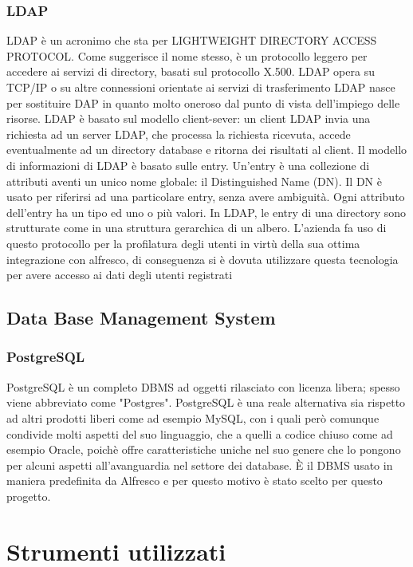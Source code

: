 \subsubsection{LDAP}
LDAP è un acronimo che sta per LIGHTWEIGHT DIRECTORY ACCESS
PROTOCOL. Come suggerisce il nome stesso, è un protocollo leggero per accedere
ai servizi di directory, basati sul protocollo X.500. LDAP opera su TCP/IP o su altre
connessioni orientate ai servizi di trasferimento LDAP nasce per sostituire DAP in
quanto molto oneroso dal punto di vista dell’impiego delle risorse. LDAP è basato
sul modello client-sever: un client LDAP invia una richiesta ad un server LDAP, che
processa la richiesta ricevuta, accede eventualmente ad un directory database e ritorna
dei risultati al client.
Il modello di informazioni di LDAP è basato sulle entry. Un’entry è una collezione di
attributi aventi un unico nome globale: il Distinguished Name (DN). Il DN è usato
per riferirsi ad una particolare entry, senza avere ambiguità.
Ogni attributo dell’entry ha un tipo ed uno o più valori.
In LDAP, le entry di una directory sono strutturate come in una struttura gerarchica
di un albero.
L'azienda fa uso di questo protocollo per la profilatura degli utenti in virtù della sua ottima integrazione con alfresco, di conseguenza si è dovuta utilizzare questa tecnologia per avere accesso ai dati degli utenti registrati
\subsection{Data Base Management System}
\subsubsection{PostgreSQL}
PostgreSQL  è un completo DBMS ad oggetti rilasciato con licenza libera; spesso viene abbreviato come "Postgres".
PostgreSQL è una reale alternativa sia rispetto ad altri prodotti liberi come ad esempio MySQL, con i quali però comunque condivide molti aspetti del suo linguaggio, che a quelli a codice chiuso come ad esempio Oracle, poichè offre caratteristiche uniche nel suo genere che lo pongono per alcuni aspetti all'avanguardia nel settore dei database. È il DBMS usato in maniera predefinita da Alfresco e per questo motivo è stato scelto per questo progetto.
\section{Strumenti utilizzati}
